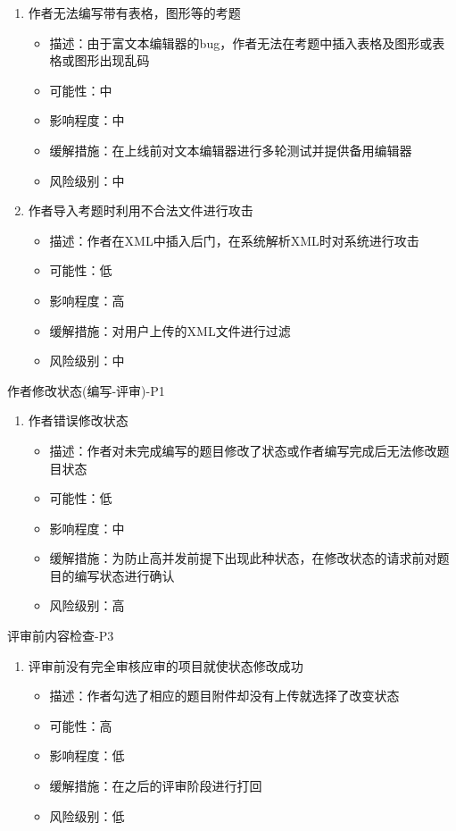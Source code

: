 \documentclass[hyperref, a4paper]{ctexart}
\providecommand{\tightlist}{%
  \setlength{\itemsep}{0pt}\setlength{\parskip}{0pt}}
\begin{document}
\begin{enumerate}
\def\labelenumi{\arabic{enumi}.}
\tightlist
\item
  作者无法编写带有表格，图形等的考题

  \begin{itemize}
  \tightlist
  \item
    描述：由于富文本编辑器的bug，作者无法在考题中插入表格及图形或表格或图形出现乱码
  \item
    可能性：中
  \item
    影响程度：中
  \item
    缓解措施：在上线前对文本编辑器进行多轮测试并提供备用编辑器
  \item
    风险级别：中
  \end{itemize}
\item
  作者导入考题时利用不合法文件进行攻击

  \begin{itemize}
  \tightlist
  \item
    描述：作者在XML中插入后门，在系统解析XML时对系统进行攻击
  \item
    可能性：低
  \item
    影响程度：高
  \item
    缓解措施：对用户上传的XML文件进行过滤
  \item
    风险级别：中
  \end{itemize}
\end{enumerate}

作者修改状态(编写-评审)-P1

\begin{enumerate}
\def\labelenumi{\arabic{enumi}.}
\tightlist
\item
  作者错误修改状态

  \begin{itemize}
  \tightlist
  \item
    描述：作者对未完成编写的题目修改了状态或作者编写完成后无法修改题目状态
  \item
    可能性：低
  \item
    影响程度：中
  \item
    缓解措施：为防止高并发前提下出现此种状态，在修改状态的请求前对题目的编写状态进行确认
  \item
    风险级别：高
  \end{itemize}
\end{enumerate}

评审前内容检查-P3

\begin{enumerate}
\def\labelenumi{\arabic{enumi}.}
\tightlist
\item
  评审前没有完全审核应审的项目就使状态修改成功

  \begin{itemize}
  \tightlist
  \item
    描述：作者勾选了相应的题目附件却没有上传就选择了改变状态
  \item
    可能性：高
  \item
    影响程度：低
  \item
    缓解措施：在之后的评审阶段进行打回
  \item
    风险级别：低
  \end{itemize}
\end{enumerate}
\end{document}
